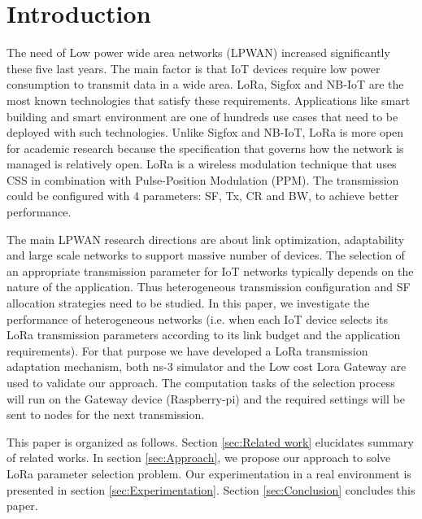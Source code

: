 \section{Introduction} \label{sec:Introduction}

The need of Low power wide area networks (LPWAN) increased significantly these five last years.
The main factor is that IoT devices require low power consumption to transmit data in a wide area.
LoRa,
	Sigfox and NB-IoT are the most known technologies that satisfy these requirements.
Applications like smart building and smart environment are one of hundreds use cases that need to be deployed with such technologies.
Unlike Sigfox and NB-IoT,
	LoRa is more open for academic research because the specification that governs how the network is managed is relatively open.
LoRa is a wireless modulation technique that uses \ac{CSS} in combination with Pulse-Position Modulation (PPM).
The transmission could be configured with 4 parameters:
	\ac{SF},
	\ac{Tx},
	\ac{CR} and \ac{BW},
	to achieve better performance.

The main LPWAN research directions are about link optimization, adaptability and large scale networks to support massive number of devices.
The selection of an appropriate transmission parameter for IoT networks typically depends on the nature of the application.
Thus heterogeneous transmission configuration and \ac{SF} allocation strategies need to be studied.
In this paper,
	we investigate the performance of heterogeneous networks (i.e.
when each IoT device selects its LoRa transmission parameters according to its link budget and the application requirements).
For that purpose we have developed a LoRa transmission adaptation mechanism,
	both ns-3 simulator and the Low cost Lora Gateway \cite{lowcostloragateway} are used to validate our approach.
The computation tasks of the selection process will run on the Gateway device (Raspberry-pi) and the required settings will be sent to nodes for the next transmission.

This paper is organized as follows.
Section \ref{sec:Related work} elucidates summary of related works.
In section \ref{sec:Approach}, we propose our approach to solve LoRa parameter selection problem.
Our experimentation in a real environment is presented in section \ref{sec:Experimentation}.
Section \ref{sec:Conclusion} concludes this paper.


